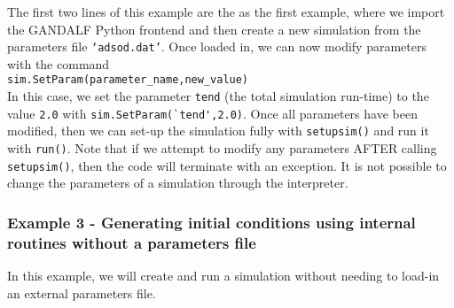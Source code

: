 \documentclass[a4paper]{article}
\newcommand{\var}[1]{\texttt{#1}}
\newcommand{\singlecommand}[1]{\\ \newline \indent \var{#1} \\ \newline \noindent}
\begin{document}





\noindent The first two lines of this example are the as the first example, where we import the GANDALF Python frontend and then create a new simulation from the parameters file \var{`adsod.dat'}.  Once loaded in, we can now modify parameters with the command \singlecommand{sim.SetParam(parameter\_name,new\_value)}  In this case, we set the parameter \var{tend} (the total simulation run-time) to the value \var{2.0} with \lstinline{sim.SetParam(`tend',2.0)}.  Once all parameters have been modified, then we can set-up the simulation fully with \lstinline{setupsim()} and run it with \lstinline{run()}.  Note that if we attempt to modify any parameters AFTER calling \lstinline{setupsim()}, then the code will terminate with an exception. It is not possible to change the parameters of a simulation through the interpreter.


\subsubsection{Example 3 - Generating initial conditions using internal routines without a parameters file}
In this example, we will create and run a simulation without needing to load-in an external parameters file. \\
\end{document}

